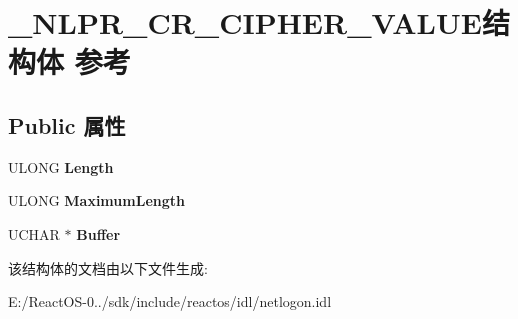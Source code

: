 \hypertarget{struct___n_l_p_r___c_r___c_i_p_h_e_r___v_a_l_u_e}{}\section{\+\_\+\+N\+L\+P\+R\+\_\+\+C\+R\+\_\+\+C\+I\+P\+H\+E\+R\+\_\+\+V\+A\+L\+U\+E结构体 参考}
\label{struct___n_l_p_r___c_r___c_i_p_h_e_r___v_a_l_u_e}
\subsection*{Public 属性}
\begin{DoxyCompactItemize}
\item 
\mbox{\label{struct___n_l_p_r___c_r___c_i_p_h_e_r___v_a_l_u_e_a8291585ac7e126597e0903e18573915a}} 
U\+L\+O\+NG {\bfseries Length}
\item 
\mbox{\label{struct___n_l_p_r___c_r___c_i_p_h_e_r___v_a_l_u_e_a3a9467b885724f0401994e4e1fff236a}} 
U\+L\+O\+NG {\bfseries Maximum\+Length}
\item 
\mbox{\label{struct___n_l_p_r___c_r___c_i_p_h_e_r___v_a_l_u_e_ae93aeb277b72f3580e868939223d5e98}} 
U\+C\+H\+AR $\ast$ {\bfseries Buffer}
\end{DoxyCompactItemize}


该结构体的文档由以下文件生成\+:\begin{DoxyCompactItemize}
\item 
E\+:/\+React\+O\+S-\/0../sdk/include/reactos/idl/netlogon.\+idl\end{DoxyCompactItemize}
